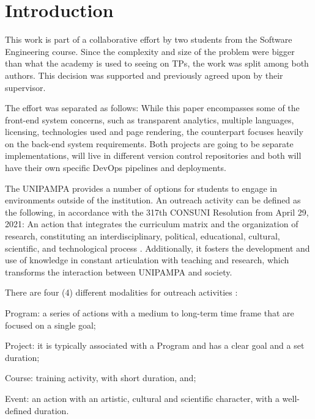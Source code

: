 \chapter{Introduction}\label{introduction}

This work is part of a collaborative effort by two students from the Software Engineering course. Since the complexity and size of the problem were bigger than what the academy is used to seeing on \acp{TP}, the work was split among both authors. This decision was supported and previously agreed upon by their supervisor.

The effort was separated as follows: While this paper encompasses some of the front-end system concerns, such as transparent analytics, multiple languages, licensing, technologies used and page rendering, the counterpart focuses heavily on the back-end system requirements. Both projects are going to be separate implementations, will live in different version control repositories and both will have their own specific DevOps pipelines and deployments.

The \acl{UNIPAMPA} provides a number of options for students to engage in environments outside of the institution. An outreach activity can be defined as the following, in accordance with the 317th CONSUNI Resolution from April 29, 2021: An action that integrates the curriculum matrix and the organization of research, constituting an interdisciplinary, political, educational, cultural, scientific, and technological process \cite{res317}. Additionally, it fosters the development and use of knowledge in constant articulation with teaching and research, which transforms the interaction between \ac{UNIPAMPA} and society.

There are four (4) different modalities for outreach activities \cite{res317}:
\begin{inparaenum}[(i)]
  \item Program: a series of actions with a medium to long-term time frame that are focused on a single goal;
  \item Project: it is typically associated with a Program and has a clear goal and a set duration;
  \item Course: training activity, with short duration, and;
  \item Event: an action with an artistic, cultural and scientific character, with a well-defined duration.
\end{inparaenum}

